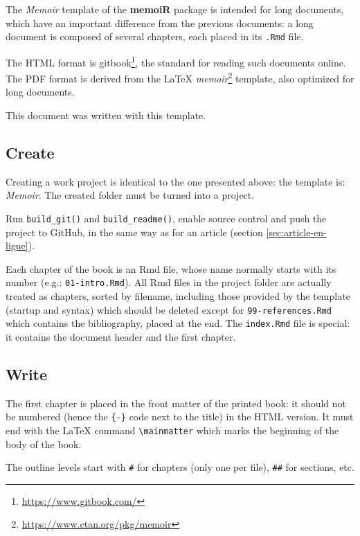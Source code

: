 \documentclass[
  12pt,
  american,
  a4paper,
  extrafontsizes,onecolumn,openright
  ]{memoir}
\begin{document}
The \emph{Memoir} template of the \textbf{memoiR} package is intended for long documents, which have an important difference from the previous documents: a long document is composed of several chapters, each placed in its \texttt{.Rmd} file.

The HTML format is gitbook\footnote{\url{https://www.gitbook.com/}}, the standard for reading such documents online.
The PDF format is derived from the LaTeX \emph{memoir}\footnote{\url{https://www.ctan.org/pkg/memoir}} template, also optimized for long documents.

This document was written with this template.

\hypertarget{create-1}{%
\subsection{Create}\label{create-1}}

Creating a work project is identical to the one presented above: the template is: \emph{Memoir}.
The created folder must be turned into a project.

Run \texttt{build\_git()} and \texttt{build\_readme()}, enable source control and push the project to GitHub, in the same way as for an article (section \ref{sec:article-en-ligne}).

Each chapter of the book is an Rmd file, whose name normally starts with its number (e.g.: \texttt{01-intro.Rmd}).
All Rmd files in the project folder are actually treated as chapters, sorted by filename, including those provided by the template (startup and syntax) which should be deleted except for \texttt{99-references.Rmd} which contains the bibliography, placed at the end.
The \texttt{index.Rmd} file is special: it contains the document header and the first chapter.

\hypertarget{write-1}{%
\subsection{Write}\label{write-1}}

The first chapter is placed in the front matter of the printed book: it should not be numbered (hence the \texttt{\{-\}} code next to the title) in the HTML version.
It must end with the LaTeX command \texttt{\textbackslash{}mainmatter} which marks the beginning of the body of the book.

The outline levels start with \texttt{\#} for chapters (only one per file), \texttt{\#\#} for sections, etc.
\end{document}
